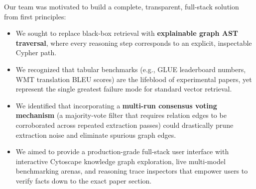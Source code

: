Our team was motivated to build a complete, transparent, full-stack solution from first principles:
\begin{itemize}
    \item We sought to replace black-box retrieval with \textbf{explainable graph AST traversal}, where every reasoning step corresponds to an explicit, inspectable Cypher path.
    \item We recognized that tabular benchmarks (e.g., GLUE leaderboard numbers, WMT translation BLEU scores) are the lifeblood of experimental papers, yet represent the single greatest failure mode for standard vector retrieval.
    \item We identified that incorporating a \textbf{multi-run consensus voting mechanism} (a majority-vote filter that requires relation edges to be corroborated across repeated extraction passes) could drastically prune extraction noise and eliminate spurious graph edges.
    \item We aimed to provide a production-grade full-stack user interface with interactive Cytoscape knowledge graph exploration, live multi-model benchmarking arenas, and reasoning trace inspectors that empower users to verify facts down to the exact paper section.
\end{itemize}

